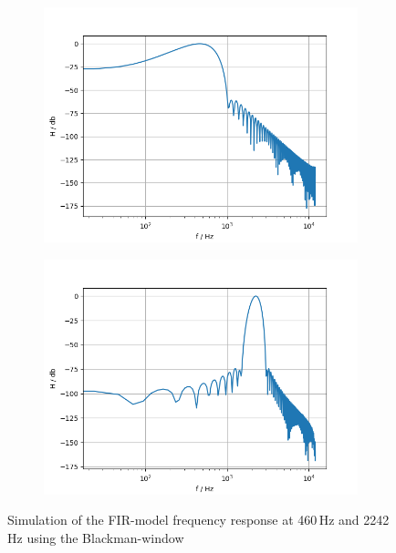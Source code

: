 \begin{figure}[!h]
    \centering
    \begin{subfigure}[c]{0.49\textwidth}
        \centering
        \includegraphics[width=\textwidth]{img/fir_bandpass460_blackman.png}
    \end{subfigure}
    \begin{subfigure}[c]{0.49\textwidth}
        \centering
        \includegraphics[width=\textwidth]{img/fir_bandpass2242_blackman.png}
    \end{subfigure}
    \caption{Simulation of the \ac{FIR}-model frequency response at 460\,Hz and 2242\,Hz using the Blackman-window}
    \label{fig:fir-sim-blackman}
\end{figure}


